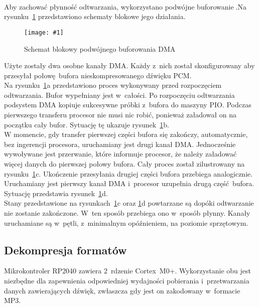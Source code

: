 \documentclass[polish]{aghengthesis}
\newcommand{\imgint}[4]{
	\begin{figure}[{#4}]
		\centering
		\texttt{[image: \#1]}
		\caption{#2}
		\label{#1}
	\end{figure}
}
\newcommand{\imgh}[3]{\imgint{#1}{#2}{#3}{H}}
\begin{document}
			\newcommand{\rdmabuf}[1]{\ref{3/PicoRadio-dma-buf}#1}
			\newcommand{\dmacite}{\textsuperscript{\cite{dma_dbl_buf1} \cite{dma_dbl_buf2}}}
			
			Aby zachować płynność odtwarzania, wykorzystano podwójne buforowanie\dmacite{}.Na rysunku~\rdmabuf{} przedstawiono schematy blokowe jego działania.
			
			\imgh{3/PicoRadio-dma-buf}{Schemat blokowy podwójnego buforowania DMA\dmacite{}}{1}
			
			Użyte zostały dwa osobne kanały DMA. Każdy z~nich został skonfigurowany aby przesyłał połowę bufora nieskompresowanego dźwięku PCM.
			$ $\\
			
			Na rysunku~\rdmabuf{a} przedstawiono proces wykonywany przed rozpoczęciem odtwarzania.
			Bufor wypełniany jest w~całości.
			Po rozpoczęciu odtwarzania podsystem DMA kopiuje sukcesywne próbki z~bufora do maszyny PIO. Podczas pierwszego transferu procesor nie musi nic robić, ponieważ załadował on na początku cały bufor. Sytuację tę ukazuje rysunek~\rdmabuf{b}.
			$ $\\
			
			W momencie, gdy transfer pierwszej części bufora się zakończy, automatycznie, bez ingerencji procesora, uruchamiany jest drugi kanał DMA. Jednocześnie wywoływane jest przerwanie, które informuje procesor, że należy załadować więcej danych do pierwszej połowy bufora. Cały proces został zilustrowany na rysunku~\rdmabuf{c}.
			Ukończenie przesyłania drugiej części bufora przebiega analogicznie. Uruchamiany jest pierwszy kanał DMA i~procesor uzupełnia drugą część bufora. Sytuację przedstawia rysunek~\rdmabuf{d}.
			$ $\\
		
			Stany przedstawione na rysunkach~\rdmabuf{c} oraz \rdmabuf{d} powtarzane są dopóki odtwarzanie nie zostanie zakończone. W~ten sposób przebiega ono w~sposób płynny. Kanały uruchamiane są w~pętli, z~minimalnym opóźnieniem, na poziomie sprzętowym. 			
		
		\subsection{Dekompresja formatów}
			\label{sec:decode}
			
			Mikrokontroler RP2040 zawiera 2~rdzenie Cortex~M0+. Wykorzystanie obu jest niezbędne dla zapewnienia odpowiedniej wydajności pobierania i~przetwarzania danych zawierających dźwięk, zwłaszcza gdy jest on zakodowany w~formacie MP3.
			$ $\\
			
\end{document}
